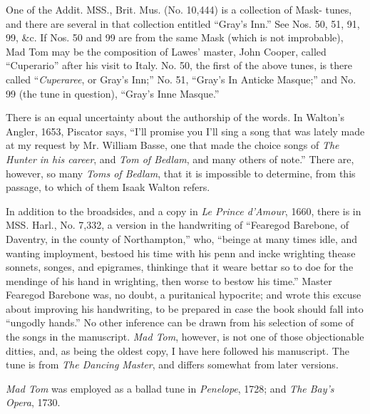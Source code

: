 One of the Addit. MSS., Brit. Mus. (No. 10,444) is a collection of Mask-
tunes, and there are several in that collection entitled “Gray’s Inn.” See
Nos. 50, 51, 91, 99, \&c. If Nos. 50 and 99 are from the same Mask (which is
not improbable), Mad Tom may be the composition of Lawes’ master, John
Cooper, called “Cuperario” after his visit to Italy. No. 50, the first of the
above tunes, is there called “\textit{Cuperaree}, or Gray’s Inn;” No. 51, “Gray’s In
Anticke Masque;” and No. 99 (the tune in question), “Gray’s Inne Masque.”

There is an equal uncertainty about the authorship of the words. In Walton’s
Angler, 1653, Piscator says, “I’ll promise you I’ll sing a song that was lately
made at my request by Mr. William Basse, one that made the choice songs of
\textit{The Hunter in his career}, and \textit{Tom of Bedlam}, and many others of note.” There
are, however, so many \textit{Toms of Bedlam}, that it is impossible to determine, from
this passage, to which of them Isaak Walton refers.

In addition to the broadsides, and a copy in \textit{Le Prince d’Amour}, 1660, there is
in MSS. Harl., No. 7,332, a version in the handwriting of “Fearegod Barebone, of
Daventry, in the county of Northampton,” who, “beinge at many times idle, and
wanting imployment, bestoed his time with his penn and incke wrighting thease
sonnets, songes, and epigrames, thinkinge that it weare bettar so to doe for the
mendinge of his hand in wrighting, then worse to bestow his time.” Master
Fearegod Barebone was, no doubt, a puritanical hypocrite; and wrote this excuse
about improving his handwriting, to be prepared in case the book should fall into
“ungodly hands.” No other inference can be drawn from his selection of some
of the songs in the manuscript. \textit{Mad Tom}, however, is not one of those objectionable
ditties, and, as being the oldest copy, I have here followed his manuscript.
The tune is from \textit{The Dancing Master}, and differs somewhat from later versions.

\textit{Mad Tom} was employed as a ballad tune in \textit{Penelope}, 1728; and \textit{The Bay’s
Opera}, 1730.



\pagebreak


\pagebreak

